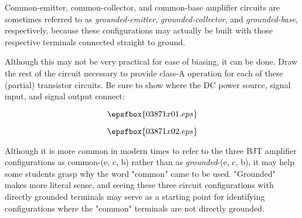 

Common-emitter, common-collector, and common-base amplifier circuits are sometimes referred to as {\it grounded-emitter}, {\it grounded-collector}, and {\it grounded-base}, respectively, because these configurations may actually be built with those respective terminals connected straight to ground.

Although this may not be very practical for ease of biasing, it can be done.  Draw the rest of the circuit necessary to provide class-A operation for each of these (partial) transistor circuits.  Be sure to show where the DC power source, signal input, and signal output connect:

\vskip 50pt

$$\epsfbox{03871x01.eps}$$







$$\epsfbox{03871x02.eps}$$







Although it is more common in modern times to refer to the three BJT amplifier configurations as common-(e, c, b) rather than as {\it grounded}-(e, c, b), it may help some students grasp why the word "common" came to be used.  "Grounded" makes more literal sense, and seeing these three circuit configurations with directly grounded terminals may serve as a starting point for identifying configurations where the "common" terminals are not directly grounded.




